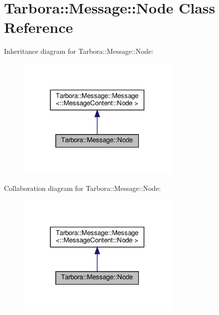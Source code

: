 \hypertarget{classTarbora_1_1Message_1_1Node}{}\section{Tarbora\+:\+:Message\+:\+:Node Class Reference}
\label{classTarbora_1_1Message_1_1Node}


Inheritance diagram for Tarbora\+:\+:Message\+:\+:Node\+:\nopagebreak
\begin{figure}[H]
\begin{center}
\leavevmode
\includegraphics[width=221pt]{classTarbora_1_1Message_1_1Node__inherit__graph}
\end{center}
\end{figure}


Collaboration diagram for Tarbora\+:\+:Message\+:\+:Node\+:\nopagebreak
\begin{figure}[H]
\begin{center}
\leavevmode
\includegraphics[width=221pt]{classTarbora_1_1Message_1_1Node__coll__graph}
\end{center}
\end{figure}
